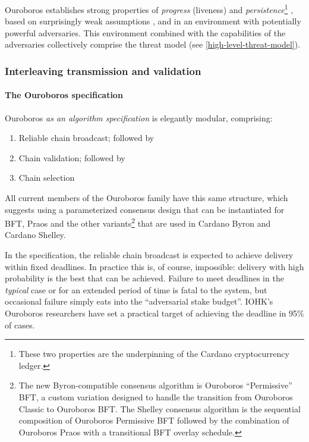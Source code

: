 \documentclass[11pt,a4paper]{article}
\begin{document}
Ouroboros establishes strong properties of \emph{progress} (liveness)
and \emph{persistence}\footnote{These two properties are the
  underpinning of the Cardano cryptocurrency ledger.} , based on
surprisingly weak assumptions \cite[Section 1]{BGKRZ19}, and in an
environment with potentially powerful adversaries. This environment
combined with the capabilities of the adversaries collectively comprise
the threat model (see \cref{high-level-threat-model}).

\subsubsection{Interleaving transmission and validation}
\label{interleaving-transmission-and-validation}

\paragraph{The Ouroboros specification}
\label{the-ouroboros-specification}

Ouroboros \emph{as an algorithm specification} is elegantly modular,
comprising:

\begin{enumerate}
\item
  Reliable chain broadcast; followed by
\item
  Chain validation; followed by
\item
  Chain selection
\end{enumerate}

All current members of the Ouroboros family have this same structure,
which suggests using a parameterized consensus design that can be
instantiated for BFT, Praos and the other variants\footnote{The new
  Byron-compatible consensus algorithm is Ouroboros ``Permissive'' BFT,
  a custom variation designed to handle the transition from Ouroboros
  Classic to Ouroboros BFT. The Shelley consensus algorithm is the
  sequential composition of Ouroboros Permissive BFT followed by the
  combination of Ouroboros Praos with a transitional BFT overlay
  schedule.} that are used in Cardano Byron and Cardano Shelley.

In the specification, the reliable chain broadcast is expected to
achieve delivery within fixed deadlines. In practice this is, of course,
impossible: delivery with high probability is the best that can be
achieved. Failure to meet deadlines in the \emph{typical} case or for an
extended period of time is fatal to the system, but occasional failure
simply eats into the ``adversarial stake budget''. IOHK's Ouroboros
researchers have set a practical target of achieving the deadline in
95\% of cases.
\end{document}
